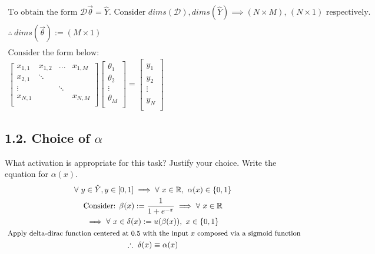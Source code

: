 \documentclass[11pt]{article}
\theoremstyle{plain}
\begin{document}
\[
	\begin{gathered}
		\text{To obtain the form $\mathcal{D}\vec{\theta} = \hat{Y}$. Consider $dims(\mathcal{D}), dims(\hat{Y}) \implies (N \times M)$, $(N \times 1)$ respectively.} \\
		\therefore ~dims(\vec{\theta}) := (M \times 1) \\ \\
		\text{Consider the form below: } \\
		\begin{bmatrix}
			x_{1,1} & x_{1,2} & ...    & x_{1,M} \\
			x_{2,1} & \ddots                     \\
			\vdots  &         & \ddots           \\
			x_{N,1} &         &        & x_{N,M} \\
		\end{bmatrix}
		\begin{bmatrix}
			\theta_1 \\
			\theta_2 \\
			\vdots   \\
			\theta_M \\
		\end{bmatrix}
		=
		\begin{bmatrix}
			\hat{y}_1 \\
			\hat{y}_2 \\
			\vdots    \\
			\hat{y}_N \\
		\end{bmatrix}
	\end{gathered}
\]
\subsection*{1.2. Choice of $\alpha$ }
What activation is appropriate for this task? Justify your choice. Write the equation for  $\alpha(x)$.
\[
	\begin{gathered}
		\forall ~y \in \hat{Y}, y \in [0,1] \implies \forall ~x \in \mathbb{R}, ~\alpha(x) \in \{ 0,1 \} \\
		\text{Consider: } \beta(x) := \frac{1}{1+e^{-x}} \implies \forall ~x \in \mathbb{R}  \\
        \implies \forall ~x \in \delta(x) := u(\beta(x)), ~x \in \{ 0,1 \} \\
        \small{\text{ Apply delta-dirac function centered at $0.5$ with the input $x$ composed via a sigmoid function}} \\
        \therefore ~\delta(x) \equiv \alpha(x)
	\end{gathered}
\]
\end{document}

